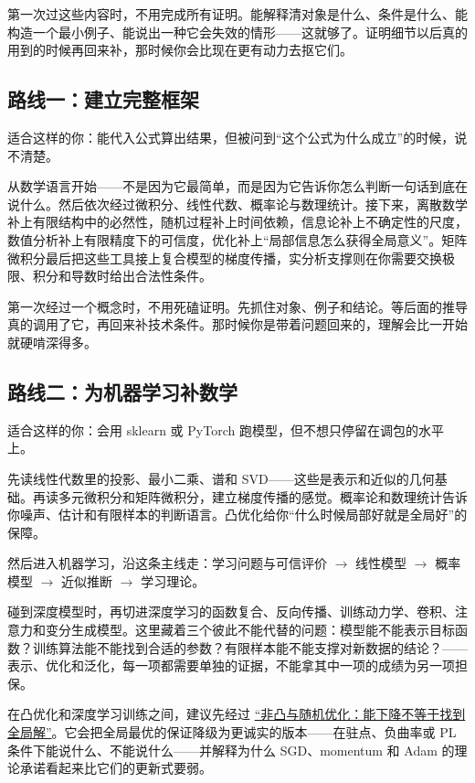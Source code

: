 第一次过这些内容时，不用完成所有证明。能解释清对象是什么、条件是什么、能构造一个最小例子、能说出一种它会失效的情形——这就够了。证明细节以后真的用到的时候再回来补，那时候你会比现在更有动力去抠它们。

\subsection{路线一：建立完整框架}

适合这样的你：能代入公式算出结果，但被问到``这个公式为什么成立''的时候，说不清楚。

从数学语言开始——不是因为它最简单，而是因为它告诉你怎么判断一句话到底在说什么。然后依次经过微积分、线性代数、概率论与数理统计。接下来，离散数学补上有限结构中的必然性，随机过程补上时间依赖，信息论补上不确定性的尺度，数值分析补上有限精度下的可信度，优化补上``局部信息怎么获得全局意义''。矩阵微积分最后把这些工具接上复合模型的梯度传播，实分析支撑则在你需要交换极限、积分和导数时给出合法性条件。

第一次经过一个概念时，不用死磕证明。先抓住对象、例子和结论。等后面的推导真的调用了它，再回来补技术条件。那时候你是带着问题回来的，理解会比一开始就硬啃深得多。

\subsection{路线二：为机器学习补数学}

适合这样的你：会用 sklearn 或 PyTorch 跑模型，但不想只停留在调包的水平上。

先读线性代数里的投影、最小二乘、谱和 SVD——这些是表示和近似的几何基础。再读多元微积分和矩阵微积分，建立梯度传播的感觉。概率论和数理统计告诉你噪声、估计和有限样本的判断语言。凸优化给你``什么时候局部好就是全局好''的保障。

然后进入机器学习，沿这条主线走：学习问题与可信评价 \(\to\) 线性模型 \(\to\) 概率模型 \(\to\) 近似推断 \(\to\) 学习理论。

碰到深度模型时，再切进深度学习的函数复合、反向传播、训练动力学、卷积、注意力和变分生成模型。这里藏着三个彼此不能代替的问题：模型能不能表示目标函数？训练算法能不能找到合适的参数？有限样本能不能支撑对新数据的结论？——表示、优化和泛化，每一项都需要单独的证据，不能拿其中一项的成绩为另一项担保。

在凸优化和深度学习训练之间，建议先经过 \hyperref[ch:078]{``非凸与随机优化：能下降不等于找到全局解''}。它会把全局最优的保证降级为更诚实的版本——在驻点、负曲率或 PL 条件下能说什么、不能说什么——并解释为什么 SGD、momentum 和 Adam 的理论承诺看起来比它们的更新式要弱。

